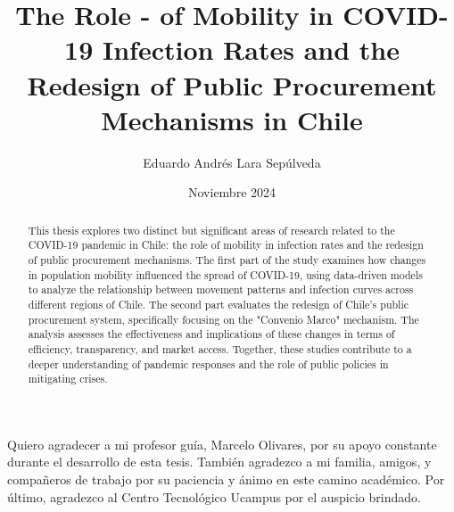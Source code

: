 \documentclass[upright, contnum]{umemoria}
\author{Eduardo Andrés Lara Sepúlveda}
\title{The Role - of Mobility in COVID-19 Infection Rates and the Redesign of Public Procurement Mechanisms in Chile}
\date{Noviembre 2024}
\begin{document}
\frontmatter
\maketitle

\begin{abstract}
{This thesis explores two distinct but significant areas of research 
related to the COVID-19 pandemic in Chile: the role of mobility in 
infection rates and the redesign of public procurement mechanisms. 
The first part of the study examines how changes in population mobility 
influenced the spread of COVID-19, using data-driven models to analyze 
the relationship between movement patterns and infection curves across 
different regions of Chile. The second part evaluates the redesign of 
Chile's public procurement system, specifically focusing on the 
"Convenio Marco" mechanism. The analysis assesses the effectiveness 
and implications of these changes in terms of efficiency, transparency, 
and market access. Together, these studies contribute to a deeper 
understanding of pandemic responses and the role of public policies 
in mitigating crises.}
\end{abstract}

\begin{dedicatoria} %
\end{dedicatoria}

\begin{thanks} %
    \cambiarlinea{} Quiero agradecer a mi profesor guía, Marcelo Olivares, por su apoyo constante 
    durante el desarrollo de esta tesis. También agradezco a mi familia, amigos, 
    y compañeros de trabajo por su paciencia y ánimo en este camino académico. 
    Por último, agradezco al Centro Tecnológico Ucampus por el auspicio brindado.
    \end{thanks}
    
\cleardoublepage %

\tableofcontents
\listoftables %
\listoffigures %

\mainmatter %

% 


% 
% 



% 
% 

\end{document}
